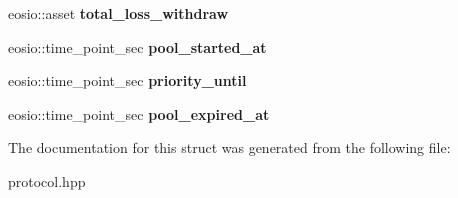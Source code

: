 \begin{DoxyCompactItemize}
eosio\+::asset {\bfseries total\+\_\+loss\+\_\+withdraw}
\item 
\mbox{\label{structeosio_1_1pool_a9432bde44a38b416c5317c488805523f}} 
eosio\+::time\+\_\+point\+\_\+sec {\bfseries pool\+\_\+started\+\_\+at}
\item 
\mbox{\label{structeosio_1_1pool_a59787660890e4bda98e981b882a77f4e}} 
eosio\+::time\+\_\+point\+\_\+sec {\bfseries priority\+\_\+until}
\item 
\mbox{\label{structeosio_1_1pool_a3f19a2b1d326449883b229082206b66c}} 
eosio\+::time\+\_\+point\+\_\+sec {\bfseries pool\+\_\+expired\+\_\+at}
\end{DoxyCompactItemize}


The documentation for this struct was generated from the following file\+:\begin{DoxyCompactItemize}
\item 
protocol.\+hpp\end{DoxyCompactItemize}
